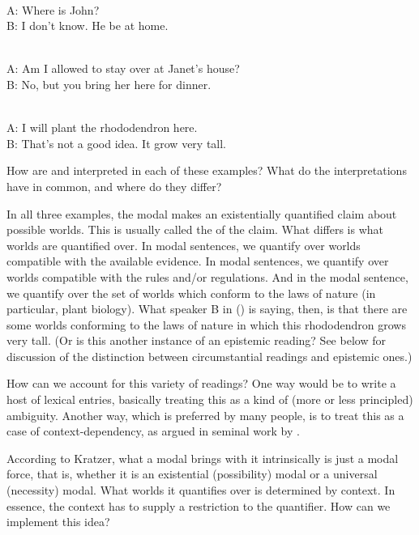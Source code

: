 \ex \label{epist}\\[6pt]
A: Where is John?\\
B: I don't know. He  be at home. \xe

\ex {}\\[6pt]
A: Am I allowed to stay over at Janet's house?\\
B: No, but you  bring her here for dinner. \xe

\ex {}\\[6pt]
A: I will plant the rhododendron here.\\
B: That's not a good idea. It  grow very tall. \xe

How are  and  interpreted in each of
these examples? What do the interpretations have in common, and where
do they differ?

In all three examples, the modal makes an existentially quantified
claim about possible worlds. This is usually called the  of the claim. What differs is what worlds are quantified
over. In  modal sentences, we quantify over worlds
compatible with the available evidence. In  modal
sentences, we quantify over worlds compatible with the rules and/or
regulations. And in the  modal sentence, we
quantify over the set of worlds which conform to the laws of nature
(in particular, plant biology). What speaker B in (\lastx) is saying,
then, is that there are some worlds conforming to the laws of nature
in which this rhododendron grows very tall. (Or is this another
instance of an epistemic reading? See below for discussion of the
distinction between circumstantial readings and epistemic ones.)

How can we account for this variety of readings? One way would be to
write a host of lexical entries, basically treating this as a kind of
(more or less principled) ambiguity. Another
way,
which is preferred by many people, is to treat this as a case of
context-dependency, as argued in seminal work by
\citet{kratzer:1977:must-can,kratzer:1978:dissertation,kratzer:1981:notional,kratzer:1991:modality}.

According to
Kratzer, what a modal brings with it intrinsically is just a modal
force, that is, whether it is an existential (possibility) modal or a
universal (necessity) modal. What worlds it quantifies over is
determined by context. In essence, the context has to supply a
restriction to the quantifier. How can we implement this idea?

